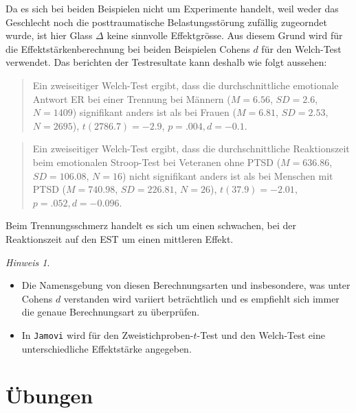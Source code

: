 \documentclass[
]{book}
\providecommand{\tightlist}{%
  \setlength{\itemsep}{0pt}\setlength{\parskip}{0pt}}
\theoremstyle{definition}
\theoremstyle{definition}
\theoremstyle{definition}
\theoremstyle{definition}
\theoremstyle{remark}
\newtheorem*{remark}{Hinweis}
\begin{document}
Da es sich bei beiden Beispielen nicht um Experimente handelt, weil weder das Geschlecht noch die posttraumatische Belastungsstörung zufällig zugeorndet wurde, ist hier Glass \(\Delta\) keine sinnvolle Effektgrösse. Aus diesem Grund wird für die Effektstärkenberechnung bei beiden Beispielen Cohens \(d\) für den Welch-Test verwendet. Das berichten der Testresultate kann deshalb wie folgt aussehen:

\begin{quote}
Ein zweiseitiger Welch-Test ergibt, dass die durchschnittliche emotionale Antwort ER bei einer Trennung bei Männern (\(M = 6.56\), \(SD = 2.6\), \(N = 1409\)) signifikant anders ist als bei Frauen (\(M = 6.81\), \(SD = 2.53\), \(N = 2695\)), \(t(2786.7) = -2.9\), \(p = .004, d = -0.1\).
\end{quote}

\begin{quote}
Ein zweiseitiger Welch-Test ergibt, dass die durchschnittliche Reaktionszeit beim emotionalen Stroop-Test bei Veteranen ohne PTSD (\(M = 636.86\), \(SD = 106.08\), \(N = 16\)) nicht signifikant anders ist als bei Menschen mit PTSD (\(M = 740.98\), \(SD = 226.81\), \(N = 26\)), \(t(37.9) = -2.01\), \(p = .052, d = -0.096\).
\end{quote}

Beim Trennungsschmerz handelt es sich um einen schwachen, bei der Reaktionszeit auf den EST um einen mittleren Effekt.

\begin{caution}

\begin{remark}
\leavevmode

\begin{itemize}
\tightlist
\item
  Die Namensgebung von diesen Berechnungsarten und insbesondere, was unter Cohens \(d\) verstanden wird variiert beträchtlich und es empfiehlt sich immer die genaue Berechnungsart zu überprüfen.
\item
  In \texttt{Jamovi} wird für den Zweistichproben-\(t\)-Test und den Welch-Test eine unterschiedliche Effektstärke angegeben.
\end{itemize}

\end{remark}

\end{caution}

\section{Übungen}\label{uxfcbungen-3}
\end{document}
